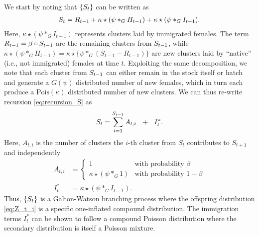 \documentclass[review]{elsarticle}
\begin{document}
We start by noting that $\{S_t\}$ can be written as
\begin{align}
S_t = R_{t - 1} + \kappa \star (\psi *_G H_{t - 1}) + \kappa \star (\psi *_G I_{t - 1}). \label{eq:recursion_S}
\end{align}
Here, $\kappa \star (\psi *_G I_{t - 1})$ represents clusters laid by immigrated females. The term  $R_{t - 1} = \beta \circ S_{t - 1}$ are the remaining clusters from $ S_{t - 1}$, while $\kappa \star (\psi *_G H_{t - 1}) = \kappa \star \{\psi *_G (S_{t - 1} - R_{t - 1})\}$ are new clusters laid by ``native'' (i.e., not immigrated) females at time $t$. Exploiting the same decomposition, we note that each cluster from $S_{t - 1}$ can either remain in the stock itself or hatch and generate a $G(\psi)$ distributed number of new females, which in turn each produce a $\text{Pois}(\kappa)$ distributed number of new clusters. We can thus re-write recursion \eqref{eq:recursion_S} as
$$
\juv_t = \sum_{i = 1}^{\juv_{t - 1}} A_{t, i} \ \ + \ \ I^*_t.
$$
Here, $A_{t, i}$ is the number of clusters the $i$-th cluster from $S_t$ contributes to $S_{t + 1}$ and independently
\begin{align}
A_{t, i} & = \begin{cases}
1 & \text{with probability } \beta\\
\kappa \star (\psi *_G 1) & \text{with probability } 1 - \beta
\label{eq:Z_t_i}
\end{cases}\\
I^*_t & = \kappa\star (\psi *_G I_{t - 1}). \label{eq:I_star}
\end{align}
Thus, $\{S_t\}$ is a Galton-Watson branching process where the offspring distribution \eqref{eq:Z_t_i} is a specific one-inflated compound distribution. %
The immigration terms $I^*_t$ can be shown to follow a compound Poisson distribution where the secondary distribution is itself a Poisson mixture. %
\end{document}
